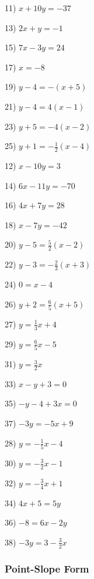\begin{multicols}{2}
  11) $x + 10 y = - 37$
  
  13) $2 x + y = - 1$
  
  15) $7 x - 3 y = 24$
  
  17) $x = - 8$
  
  19) $y - 4 = - (x + 5)$
  
  21) $y - 4 = 4 (x - 1)$
  
  23) $y + 5 = - 4 (x - 2)$
  
  25) $y + 1 = - \frac{1}{2} (x - 4)$
  
  12) $x - 10 y = 3$
  
  14) $6 x - 11 y = - 70$
  
  16) $4 x + 7 y = 28$
  
  18) $x - 7 y = - 42$
  
  20) $y - 5 = \frac{5}{2} (x - 2)$
  
  22) $y - 3 = - \frac{2}{3} (x + 3)$
  
  24) $0 = x - 4$
  
  26) $y + 2 = \frac{6}{5} (x + 5)$
\end{multicols}

{}
\label{lineargraphs2}
\begin{multicols}{2}
  27) $y = \frac{1}{3} x + 4$
  
  29) $y = \frac{6}{5} x - 5$
  
  31) $y = \frac{3}{2} x$
  
  33) $x - y + 3 = 0$
  
  35) $- y - 4 + 3 x = 0$
  
  37) $- 3 y = - 5 x + 9$
  
  28) $y = - \frac{1}{5} x - 4$
  
  30) $y = - \frac{3}{2} x - 1$
  
  32) $y = - \frac{3}{4} x + 1$
  
  34) $4 x + 5 = 5 y$
  
  36) $- 8 = 6 x - 2 y$
  
  38) $- 3 y = 3 - \frac{3}{2} x$
\end{multicols}


\pagebreak

	\subsubsection{Point-Slope Form}\par

